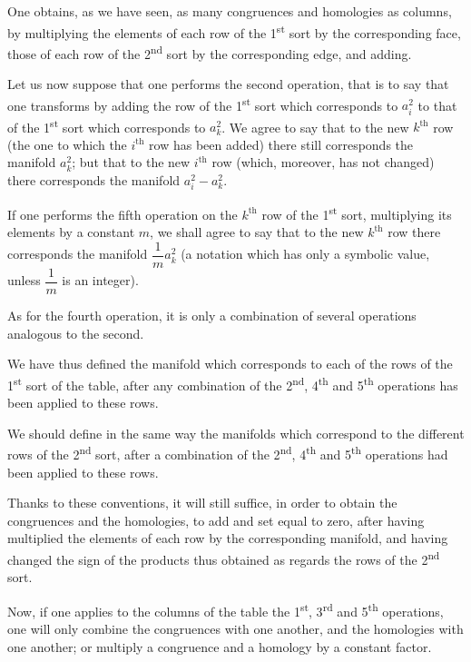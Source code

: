 \documentclass{article}
\begin{document}
One obtains, as we have seen, as many congruences and homologies as columns, by multiplying the elements of each row of the 1\textsuperscript{st} sort by the corresponding face, those of each row of the 2\textsuperscript{nd} sort by the corresponding edge, and adding.

Let us now suppose that one performs the second operation, that is to say that one transforms by adding the row of the 1\textsuperscript{st} sort which corresponds to $a^{2}_{i}$ to that of the 1\textsuperscript{st} sort which corresponds to $a^{2}_{k}$. We agree to say that to the new $k^{\text{th}}$ row (the one to which the $i^{\text{th}}$ row has been added) there still corresponds the manifold $a^{2}_{k}$; but that to the new $i^{\text{th}}$ row (which, moreover, has not changed) there corresponds the manifold $a^{2}_{i} - a^{2}_{k}$.

If one performs the fifth operation on the $k^{\text{th}}$ row of the 1\textsuperscript{st} sort, multiplying its elements by a constant $m$, we shall agree to say that to the new $k^{\text{th}}$ row there corresponds the manifold $\dfrac{1}{m} a^{2}_{k}$ (a notation which has only a symbolic value, unless $\dfrac{1}{m}$ is an integer).

As for the fourth operation, it is only a combination of several operations analogous to the second.

We have thus defined the manifold which corresponds to each of the rows of the 1\textsuperscript{st} sort of the table, after any combination of the 2\textsuperscript{nd}, 4\textsuperscript{th} and 5\textsuperscript{th} operations has been applied to these rows.

We should define in the same way the manifolds which correspond to the different rows of the 2\textsuperscript{nd} sort, after a combination of the 2\textsuperscript{nd}, 4\textsuperscript{th} and 5\textsuperscript{th} operations had been applied to these rows.

Thanks to these conventions, it will still suffice, in order to obtain the congruences and the homologies, to add and set equal to zero, after having multiplied the elements of each row by the corresponding manifold, and having changed the sign of the products thus obtained as regards the rows of the 2\textsuperscript{nd} sort.

Now, if one applies to the columns of the table the 1\textsuperscript{st}, 3\textsuperscript{rd} and 5\textsuperscript{th} operations, one will only combine the congruences with one another, and the homologies with one another; or multiply a congruence and a homology by a constant factor.
\end{document}
